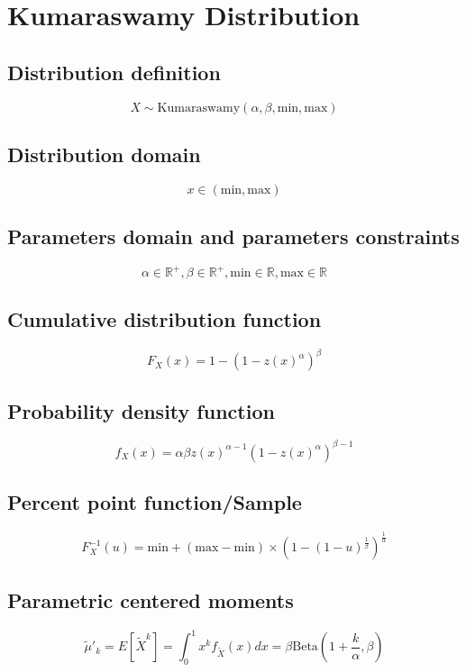\documentclass{article}
\begin{document}
\newpage
\section{Kumaraswamy Distribution}
\subsection{Distribution definition}
\begin{equation*} X\sim\mathrm{Kumaraswamy}\left(\alpha,\beta,\text{min},\text{max}\right) \end{equation*}
\subsection{Distribution domain}
\begin{equation*} x\in\left(\text{min},\text{max}\right) \end{equation*}
\subsection{Parameters domain and parameters constraints}
\begin{equation*} \alpha\in\mathbb{R}^{+}, \beta\in\mathbb{R}^{+}, \text{min}\in\mathbb{R}, \text{max}\in\mathbb{R} \end{equation*}
\subsection{Cumulative distribution function}
\begin{equation*} F_{X}\left(x\right)=1-(1-z(x)^\alpha)^\beta \end{equation*}
\subsection{Probability density function}
\begin{equation*} f_{X}\left(x\right)=\alpha \beta z(x)^{\alpha-1}(1-z(x)^\alpha)^{\beta-1} \end{equation*}
\subsection{Percent point function/Sample}
\begin{equation*} F^{-1}_{X}\left(u\right)=\text{min}+\left(\text{max}-\text{min}\right)\times (1-(1-u)^\frac{1}{\beta})^\frac{1}{\alpha} \end{equation*}
\subsection{Parametric centered moments}
\begin{equation*} \tilde{\mu}'_{k}=E[\tilde{X}^k]=\int_{0}^{1}x^{k}f_{\tilde{X}}\left(x\right)dx=\beta \text{Beta}(1+\frac{k}{\alpha},\beta) \end{equation*}
\end{document}
